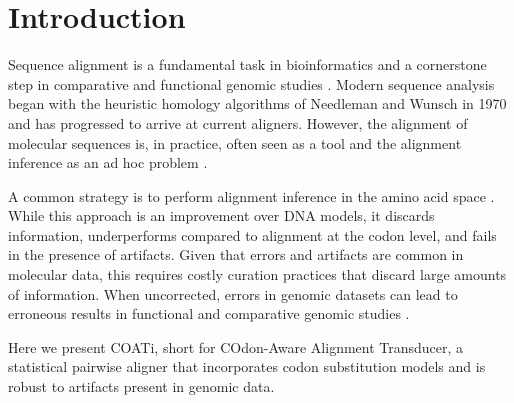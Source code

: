 \section{Introduction}

Sequence alignment is a fundamental task in bioinformatics and a cornerstone
step in comparative and functional genomic studies
\parencite{sequence_alignment_rosenberg_2009}.
Modern sequence analysis began with the heuristic homology algorithms of
Needleman and Wunsch in 1970 \parencite{identification_smith_1981} and has
progressed to arrive at current aligners.
However, the alignment of molecular sequences is, in practice, often seen as a
tool and the alignment inference as an ad hoc problem
\parencite{morrison_MSA_2018}.

A common strategy is to perform alignment inference in the amino acid space
\parencite{bininda2005transalign,abascal2010translatorx}.
While this approach is an improvement over DNA models, it discards information,
underperforms compared to alignment at the codon level, and fails in the
presence of artifacts.
Given that errors and artifacts are common in molecular data, this requires
costly curation practices that discard large amounts of information.
When uncorrected, errors in genomic datasets can lead to erroneous results in
functional and comparative genomic studies \parencite{estimates_schneider_2009}.

Here we present COATi, short for COdon-Aware Alignment Transducer, a statistical
pairwise aligner that incorporates codon substitution models and is
robust to artifacts present in genomic data.
